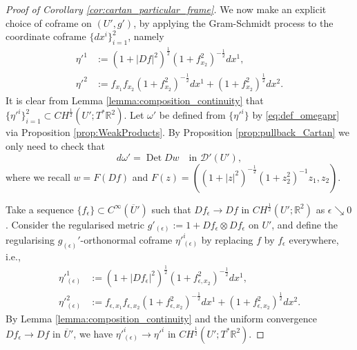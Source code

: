 \documentclass[12pt]{article}
\newcommand{\R}{\mathbb{R}}
\newcommand{\Det}{\operatorname{Det}}
\theoremstyle{plain}
\numberwithin{equation}{section}
\begin{document}
\begin{proof}[{Proof of Corollary \ref{cor:cartan_particular_frame}}]
    We now make an explicit choice of coframe on $(U',g')$, by applying the Gram-Schmidt process to the coordinate coframe $\{dx^i\}_{i=1}^2$, namely
    \begin{equation} \label{eq:coframe_choice}
        \begin{split}
            \eta'^1 &:= (1+|Df|^2)^\frac12 (1+f_{x_2}^2)^{-\frac12} dx^1,\\
            \eta'^2 &:= f_{x_1}f_{x_2} (1+f_{x_2}^2)^{-\frac12} dx^1 + (1+f_{x_2}^2)^{\frac12} dx^2.
        \end{split}
    \end{equation}
    It is clear from Lemma \ref{lemma:composition_continuity} that $\{\eta'^i\}_{i=1}^2 \subset CH^\frac12(U';T^*\R^2)$. Let $\omega'$ be defined from $\{\eta'^i\}$ by \eqref{eq:def_omegapr} via Proposition \ref{prop:WeakProducts}. By Proposition \ref{prop:pullback_Cartan} we only need to check that
    \begin{equation} \label{eq:omega_as_DetDw}
        d\omega' = \Det Dw \quad \text{in } {\mathcal{D}'(U')},
    \end{equation}
    where we recall $w = F(Df)$ and $F(z) = ((1+|z|^2)^{-\frac12} (1+z_2^2)^{-1} z_1, z_2)$. 
    
    Take a sequence $\{f_\epsilon\} \subset C^\infty(\overline U')$ such that $Df_\epsilon \to Df$ in $CH^\frac12(U';\R^2)$ as $\epsilon \searrow 0$. Consider the regularised metric $g'_{(\epsilon)} := 1+Df_{\epsilon} \otimes Df_{\epsilon}$ on $U'$, and define the regularising $g_{(\epsilon)}'$-orthonormal coframe $\eta'^i_{(\epsilon)}$ by replacing $f$ by $f_\epsilon$ everywhere, i.e.,
    \begin{equation*}
        \begin{split}
            \eta'^1_{(\epsilon)} &:= (1+|Df_\epsilon|^2)^\frac12 (1+f_{\epsilon, x_2}^2)^{-\frac12} dx^1,\\
            \eta'^2_{(\epsilon)} &:= f_{\epsilon, x_1}f_{\epsilon, x_2} (1+f_{\epsilon, x_2}^2)^{-\frac12} dx^1 + (1+f_{\epsilon, x_2}^2)^{\frac12} dx^2.
        \end{split}
    \end{equation*}
    By Lemma \ref{lemma:composition_continuity} and the uniform convergence $Df_\epsilon \to Df$ in $\overline U'$, we have $\eta'^i_{(\epsilon)} \to \eta'^i$ in $CH^\frac12(U';T^*\R^2)$. 
    

\end{proof}
\end{document}
